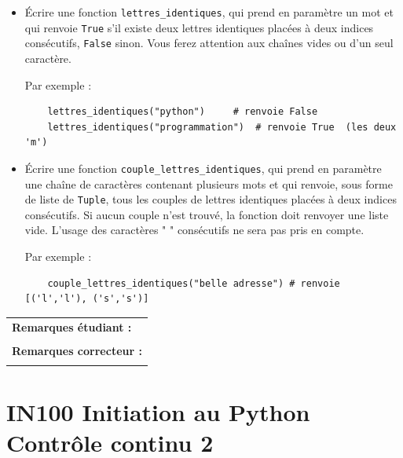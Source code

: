\documentclass[a4paper,11pt]{article}
\begin{document}
\begin{itemize}
\item[1.] Écrire une fonction \texttt{lettres\_identiques}, qui prend en paramètre un mot et qui renvoie \texttt{True} s’il existe deux lettres identiques placées à deux indices consécutifs, \texttt{False} sinon.  
Vous ferez attention aux chaînes vides ou d’un seul caractère.
\vspace*{-0.1 cm}

Par exemple :
\begin{verbatim}
    lettres_identiques("python")     # renvoie False
    lettres_identiques("programmation")  # renvoie True  (les deux 'm')
\end{verbatim}

\item[2.] Écrire une fonction \texttt{couple\_lettres\_identiques}, qui prend en paramètre une chaîne de caractères contenant plusieurs mots et qui renvoie, sous forme de liste de \texttt{Tuple}, tous les couples de lettres identiques placées à deux indices consécutifs.  
Si aucun couple n’est trouvé, la fonction doit renvoyer une liste vide. L'usage des caractères " " consécutifs ne sera pas pris en compte.  

\vspace*{-0.1 cm}

Par exemple :
\begin{verbatim}
    couple_lettres_identiques("belle adresse") # renvoie [('l','l'), ('s','s')]
\end{verbatim}
\end{itemize}

\vspace*{-0.3 cm}


\begin{table}[h!]
\centering
\renewcommand{\arraystretch}{1.4} %
\begin{tabular}{|p{15cm}|}
\hline
\textbf{Remarques étudiant :}    \\
 \\
 
\hline
\textbf{Remarques correcteur :}  \\
 \\
\hline
\end{tabular}
\end{table}

\newpage


\section*{\center IN100 Initiation au Python\\
Contrôle continu 2}
\end{document}
